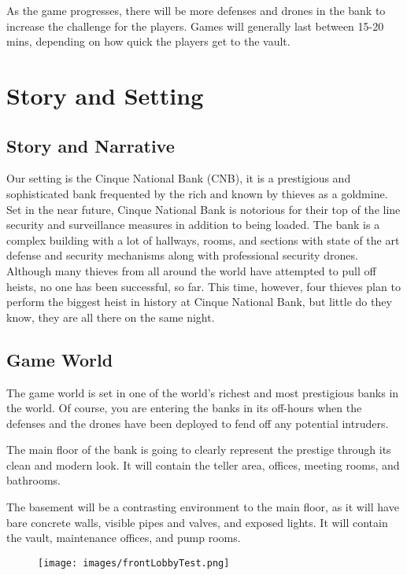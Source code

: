 \documentclass[10pt]{report}
\begin{document}
As the game progresses, there will be more defenses and drones in the bank to increase the challenge for the players. Games will generally last between 15-20 mins, depending on how quick the players get to the vault.

\chapter{Story and Setting}

\section{Story and Narrative}

Our setting is the Cinque National Bank (CNB), it is a prestigious and sophisticated bank frequented by the rich and known by thieves as a goldmine. Set in the near future, Cinque National Bank is notorious for their top of the line security and surveillance measures in addition to being loaded.  The bank is a complex building with a lot of hallways, rooms, and sections with state of the art defense and security mechanisms along with professional security drones. Although many thieves from all around the world have attempted to pull off heists, no one has been successful, so far. This time, however, four thieves plan to perform the biggest heist in history at Cinque National Bank, but little do they know, they are all there on the same night.

\section{Game World}

The game world is set in one of the world’s richest and most prestigious banks in the world. Of course, you are entering the banks in its off-hours when the defenses and the drones have been deployed to fend off any potential intruders. 

The main floor of the bank is going to clearly represent the prestige through its clean and modern look. It will contain the teller area, offices, meeting rooms, and bathrooms. 

The basement will be a contrasting environment to the main floor, as it will have bare concrete walls, visible pipes and valves, and exposed lights. It will contain the vault, maintenance offices, and pump rooms. 

\begin{figure}
    \texttt{[image: images/frontLobbyTest.png]}
    \caption{}
\end{figure}
\end{document}
